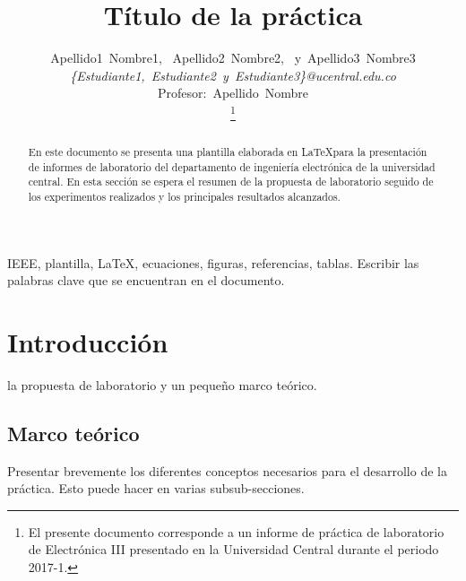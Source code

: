 \documentclass[journal]{IEEEtran}
\begin{document}
\title{Título de la práctica}
\author{Apellido1~Nombre1,~
        Apellido2~Nombre2,~
        y~Apellido3~Nombre3\\
				\textit{\{Estudiante1,~Estudiante2~y~Estudiante3\}@ucentral.edu.co}\\
				Profesor:~Apellido~Nombre\\%
\thanks{El presente documento corresponde a un informe de práctica de laboratorio de Electrónica III presentado en la Universidad Central durante el periodo 2017-1.}} %

\maketitle

\begin{abstract}
En este documento se presenta una plantilla elaborada en \LaTeX  para la presentación de informes de laboratorio del departamento de ingeniería electrónica de la universidad central. En esta sección se espera el resumen de la propuesta de laboratorio seguido de los experimentos realizados y los principales resultados alcanzados.
\end{abstract}
\begin{IEEEkeywords}
IEEE, plantilla, \LaTeX, ecuaciones, figuras, referencias, tablas. Escribir las palabras clave que se encuentran en el documento.
\end{IEEEkeywords}
\section{Introducción}
 la propuesta de laboratorio y un pequeño marco teórico.

\subsection{Marco teórico}
Presentar brevemente los diferentes conceptos necesarios para el desarrollo de la práctica. Esto puede hacer en varias subsub-secciones.
\end{document}
